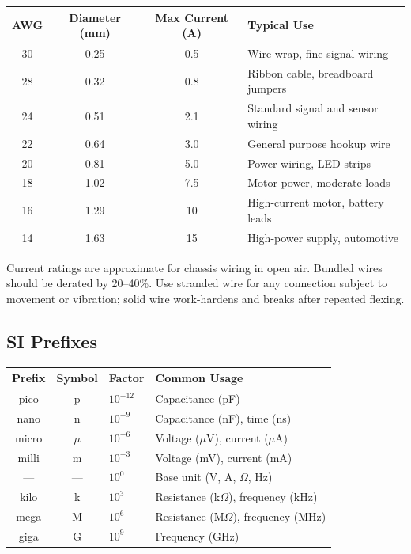 \begin{center}
\begin{tabular}{cccl}
\toprule
\textbf{AWG} & \textbf{Diameter (mm)} & \textbf{Max Current (A)} & \textbf{Typical Use} \\
\midrule
30 & 0.25 & 0.5  & Wire-wrap, fine signal wiring \\
28 & 0.32 & 0.8  & Ribbon cable, breadboard jumpers \\
24 & 0.51 & 2.1  & Standard signal and sensor wiring \\
22 & 0.64 & 3.0  & General purpose hookup wire \\
20 & 0.81 & 5.0  & Power wiring, LED strips \\
18 & 1.02 & 7.5  & Motor power, moderate loads \\
16 & 1.29 & 10   & High-current motor, battery leads \\
14 & 1.63 & 15   & High-power supply, automotive \\
\bottomrule
\end{tabular}
\end{center}

Current ratings are approximate for chassis wiring in open air. Bundled wires should be derated by 20--40\%. Use stranded wire for any connection subject to movement or vibration; solid wire work-hardens and breaks after repeated flexing.

\subsection{SI Prefixes}

\begin{center}
\begin{tabular}{ccll}
\toprule
\textbf{Prefix} & \textbf{Symbol} & \textbf{Factor} & \textbf{Common Usage} \\
\midrule
pico  & p  & $10^{-12}$ & Capacitance (pF) \\
nano  & n  & $10^{-9}$  & Capacitance (nF), time (ns) \\
micro & $\mu$ & $10^{-6}$ & Voltage ($\mu$V), current ($\mu$A) \\
milli & m  & $10^{-3}$  & Voltage (mV), current (mA) \\
---   & ---  & $10^{0}$ & Base unit (V, A, $\Omega$, Hz) \\
kilo  & k  & $10^{3}$   & Resistance (k$\Omega$), frequency (kHz) \\
mega  & M  & $10^{6}$   & Resistance (M$\Omega$), frequency (MHz) \\
giga  & G  & $10^{9}$   & Frequency (GHz) \\
\bottomrule
\end{tabular}
\end{center}

